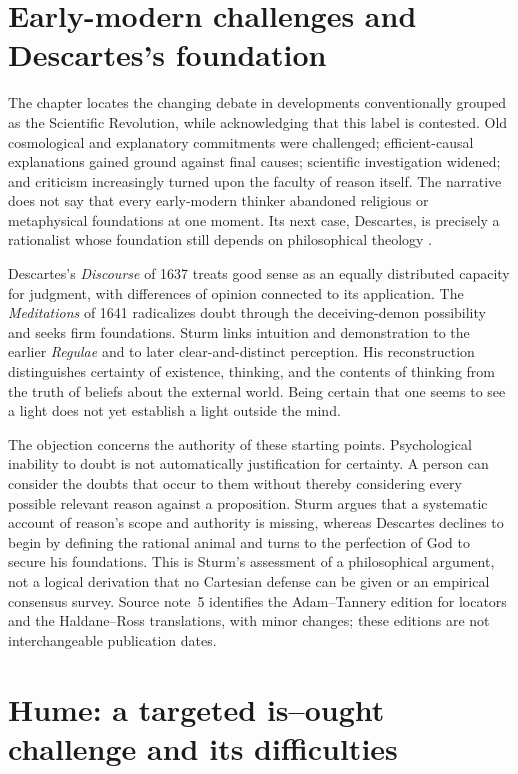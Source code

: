 \section{Early-modern challenges and Descartes's foundation}
\label{sec:p13-r11-descartes}

The chapter locates the changing debate in developments conventionally
grouped as the Scientific Revolution, while acknowledging that this
label is contested. Old cosmological and explanatory commitments were
challenged; efficient-causal explanations gained ground against final
causes; scientific investigation widened; and criticism increasingly
turned upon the faculty of reason itself. The narrative does not say
that every early-modern thinker abandoned religious or metaphysical
foundations at one moment. Its next case, Descartes, is precisely a
rationalist whose foundation still depends on philosophical theology
\parencite[pp.~73--75]{Sturm2021DescriptiveNormativeHistory}.

Descartes's \emph{Discourse} of 1637 treats good sense as an equally
distributed capacity for judgment, with differences of opinion connected
to its application. The \emph{Meditations} of 1641 radicalizes doubt
through the deceiving-demon possibility and seeks firm foundations.
Sturm links intuition and demonstration to the earlier
\emph{Regulae} and to later clear-and-distinct perception. His
reconstruction distinguishes certainty of existence, thinking, and the
contents of thinking from the truth of beliefs about the external world.
Being certain that one seems to see a light does not yet establish a
light outside the mind.

The objection concerns the authority of these starting points.
Psychological inability to doubt is not automatically justification
for certainty. A person can consider the doubts that occur to them
without thereby considering every possible relevant reason against a
proposition. Sturm argues that a systematic account of reason's scope
and authority is missing, whereas Descartes declines to begin by defining
the rational animal and turns to the perfection of God to secure his
foundations. This is Sturm's assessment of a philosophical argument,
not a logical derivation that no Cartesian defense can be given or an
empirical consensus survey. Source note~5 identifies the Adam--Tannery
edition for locators and the Haldane--Ross translations, with minor
changes; these editions are not interchangeable publication dates.

\section{Hume: a targeted is--ought challenge and its difficulties}
\label{sec:p13-r11-hume}

